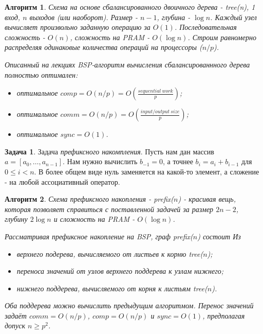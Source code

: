 \documentclass[a4paper]{article}
\theoremstyle{indented}
\newtheorem{alg}{Алгоритм}
\theoremstyle{definition}
\newtheorem{prob}{Задача}
\theoremstyle{remark}
\begin{document}
\begin{alg}
    Схема на основе \textit{сбалансированного двоичного дерева} - tree(n), 1 вход, $n$ выходов (или наоборот). Размер - $n-1$, глубина - $\log n$. Каждый узел вычисляет произвольно заданную операцию за $O(1)$. Последовательная сложность - $O(n)$, сложность на PRAM - $O(\log n)$. Строим равномерно распределяя одинаковые количества операций на процессоры ($n/p$). \ 
    
    Описанный на лекциях BSP-алгоритм вычисления сбалансированнного дерева полностью оптимален:

    \begin{itemize}
        \item оптимальное $comp=O(n/p)=O(\frac{sequential \: work}{p})$; 
        \item оптимальное $comm = O(n/p)=O(\frac{input/output \: size}{p})$; 
        \item оптимальное $sync=O(1)$. 
    \end{itemize}
\end{alg}

\begin{prob}
    Задача \textit{префиксного накомпления}. Пусть нам дан массив $a=[a_0, \ldots, a_{n-1}]$. Нам нужно вычислить $b_{-1}=0$, а точнее $b_i=a_i+b_{i-1}$ для $0\leq i < n$. В более общем виде нуль заменяется на какой-то элемент, а сложение - на любой ассоциативный оператор.
\end{prob}

\begin{alg}
    Схема \textit{префиксного накопления} - prefix($n$) - красивая вещь, которая позволяет справиться с поставленной задачей за размер $2n-2$, глубину $2 \log n$ и сложность на PRAM - $O(\log n)$. \ 

    Рассматривая префиксное накопление на BSP, граф prefix($n$) состоит Из

    \begin{itemize}
        \item верхнего подерева, вычисляемого от листьев к корню tree($n$); 
        \item переноса значений от узлов верхнего поддерева к узлам нижнего; 
        \item нижнего поддерева, вычисляемого от корня к листьям tree($n$). 
    \end{itemize}

    Оба поддерева можно вычислить предыдущим алгоритмом. Перенос значений задаёт $comm=O(n/p)$, $comp=O(n/p)$ и $sync=O(1)$, предполагая допуск $n\geq p^2$. 
\end{alg}
\end{document}
